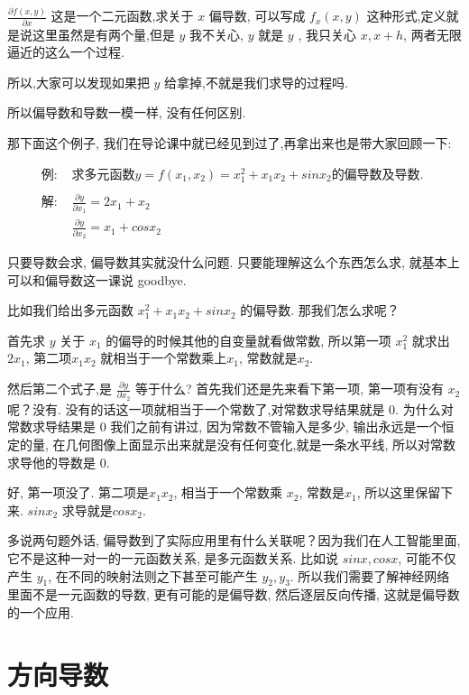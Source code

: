 $\frac{\partial f(x, y)}{\partial x}$ 这是一个二元函数,求关于 $x$ 偏导数, 可以写成 $f_x(x, y)$ 这种形式,定义就是说这里虽然是有两个量,但是 $y$ 我不关心, $y$ 就是 $y$ , 我只关心 $x, x+h$, 两者无限逼近的这么一个过程. 

所以,大家可以发现如果把 $y$ 给拿掉,不就是我们求导的过程吗. 

所以偏导数和导数一模一样, 没有任何区别. 

那下面这个例子, 我们在导论课中就已经见到过了,再拿出来也是带大家回顾一下:

\begin{align*}
  \mbox{例: } & \mbox{求多元函数} y = f(x_1, x_2) = x_1^2 + x_1x_2+sinx_2\mbox{的偏导数及导数. }\\ \\
  \mbox{解:  }& \frac{\partial y}{\partial x_1} = 2x_1 + x_2 \\
  & \frac{\partial y}{\partial x_2} = x_1 + cos x_2
\end{align*}

只要导数会求, 偏导数其实就没什么问题. 只要能理解这么个东西怎么求, 就基本上可以和偏导数这一课说 goodbye. 

比如我们给出多元函数 $x_1^2 + x_1x_2+sinx_2$ 的偏导数. 那我们怎么求呢？

首先求 $y$ 关于 $x_1$ 的偏导的时候其他的自变量就看做常数, 所以第一项 $x_1^2$ 就求出 $2x_1$, 第二项$x_1x_2$ 就相当于一个常数乘上$x_1$, 常数就是$x_2$. 

然后第二个式子,是 $\frac{\partial y}{\partial x_2}$ 等于什么? 首先我们还是先来看下第一项, 第一项有没有 $x_2$ 呢？没有. 没有的话这一项就相当于一个常数了,对常数求导结果就是 0. 为什么对常数求导结果是 0 我们之前有讲过, 因为常数不管输入是多少, 输出永远是一个恒定的量, 在几何图像上面显示出来就是没有任何变化,就是一条水平线, 所以对常数求导他的导数是 0. 

好, 第一项没了. 第二项是$x_1x_2$, 相当于一个常数乘 $x_2$, 常数是$x_1$, 所以这里保留下来. $sinx_2$ 求导就是$cosx_2$. 

多说两句题外话, 偏导数到了实际应用里有什么关联呢？因为我们在人工智能里面, 它不是这种一对一的一元函数关系, 是多元函数关系. 比如说 $sinx, cosx$, 可能不仅产生 $y_1$, 在不同的映射法则之下甚至可能产生 $y_2, y_3$. 所以我们需要了解神经网络里面不是一元函数的导数, 更有可能的是偏导数, 然后逐层反向传播, 这就是偏导数的一个应用. 

\section{方向导数}

